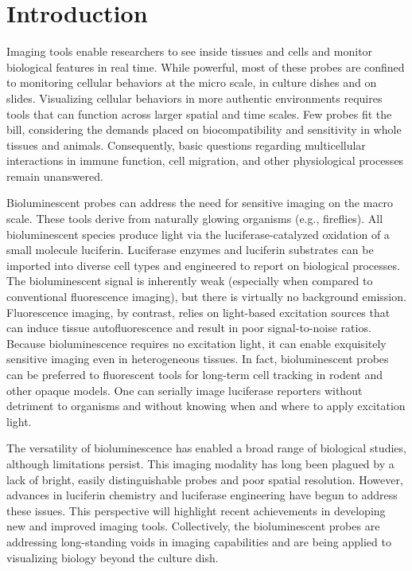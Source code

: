 
\chapter{Introduction}
Imaging tools enable researchers to see inside tissues and
cells and monitor biological features in real time. While
powerful, most of these probes are confined to monitoring
cellular behaviors at the micro scale, in culture dishes and on
slides. Visualizing cellular behaviors in more authentic environments
requires tools that can function across larger spatial and
time scales.\cite{Porterfield:2015bu} Few probes fit the bill, considering the demands
placed on biocompatibility and sensitivity in whole tissues and
animals. Consequently, basic questions regarding multicellular
interactions in immune function, cell migration, and other
physiological processes remain unanswered.
\par
Bioluminescent probes can address the need for sensitive
imaging on the macro scale. These tools derive from naturally
glowing organisms (e.g., fireflies). All bioluminescent species
produce light via the luciferase-catalyzed oxidation of a small
molecule luciferin. Luciferase enzymes and luciferin substrates
can be imported into diverse cell types and engineered to
report on biological processes.\cite{RN26} The bioluminescent signal is
inherently weak (especially when compared to conventional
fluorescence imaging), but there is virtually no background
emission. Fluorescence imaging, by contrast, relies on light-based
excitation sources that can induce tissue autofluorescence
and result in poor signal-to-noise ratios. Because bioluminescence
requires no excitation light, it can enable
exquisitely sensitive imaging even in heterogeneous tissues. In
fact, bioluminescent probes can be preferred to fluorescent
tools for long-term cell tracking in rodent and other opaque
models. One can serially image luciferase reporters without
detriment to organisms and without knowing when and
where to apply excitation light.

The versatility of bioluminescence has enabled a broad range
of biological studies, although limitations persist.\cite{RN26} This imaging
modality has long been plagued by a lack of bright, easily
distinguishable probes and poor spatial resolution. However,
advances in luciferin chemistry and luciferase engineering have
begun to address these issues. This perspective will highlight
recent achievements in developing new and improved imaging
tools. Collectively, the bioluminescent probes are addressing
long-standing voids in imaging capabilities and are being
applied to visualizing biology beyond the culture dish.
